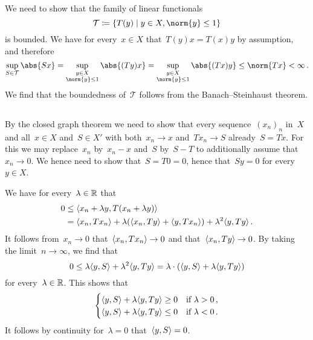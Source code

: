 \section{}





\subsection{}

We need to show that the family of linear functionals
\[
            \mathcal{T}
  \defined  \{
              T(y)
            \suchthat
              y \in X,
              \norm{y} \leq 1
            \}
\]
is bounded.
We have for every~$x \in X$ that~$T(y)x = T(x)y$ by assumption, and therefore
\[
        \sup_{S \in \mathcal{T}} \abs{ S x }
  =     \sup_{\substack{y \in X \\ \norm{y} \leq 1}} \abs{ (T y) x }
  =     \sup_{\substack{y \in X \\ \norm{y} \leq 1}} \abs{ (T x) y }
  \leq  \norm{T x}
  <     \infty  \,.
\]
We find that the boundedness of~$\mathcal{T}$ follows from the Banach--Steinhaust theorem.





\subsection{}

By the closed graph theorem we need to show that every sequence~$(x_n)_n$ in~$X$ and all~$x \in X$ and~$S \in X'$ with both~$x_n \to x$ and~$T x_n \to S$ already~$S = T x$.
For this we may replace~$x_n$ by~$x_n - x$ and~$S$ by~$S - T$ to additionally assume that~$x_n \to 0$.
We hence need to show that~$S = T 0 = 0$, hence that~$S y = 0$ for every~$y \in X$.

We have for every~$\lambda \in \mathbb{R}$ that
\begin{align*}
        0
  &\leq \langle x_n + \lambda y, T(x_n + \lambda y) \rangle \\
  &=    \langle x_n, T x_n\rangle + \lambda( \langle x_n, T y\rangle + \langle y, T x_n\rangle ) + \lambda^2 \langle y, T y\rangle \,.
\end{align*}
It follows from~$x_n \to 0$ that~$\langle x_n, T x_n\rangle \to 0$ and that~$\langle x_n, T y\rangle \to 0$.
By taking the limit~$n \to \infty$, we find that
\[
        0
  \leq  \lambda \langle y, S\rangle + \lambda^2 \langle y, Ty\rangle
  =     \lambda \cdot ( \langle y, S\rangle + \lambda \langle y, Ty\rangle )
\]
for every~$\lambda \in \mathbb{R}$.
This shows that
\[
  \begin{cases}
    \langle y, S\rangle + \lambda \langle y, Ty\rangle \geq 0 & \text{if~$\lambda > 0$} \,, \\
    \langle y, S\rangle + \lambda \langle y, Ty\rangle \leq 0 & \text{if~$\lambda < 0$} \,.
  \end{cases}
\]
It follows by continuity for~$\lambda = 0$ that~$\langle y,S\rangle = 0$.




